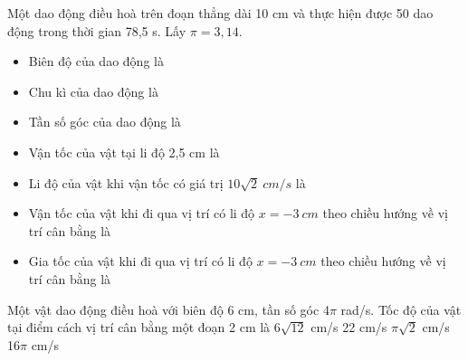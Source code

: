 \begin{vidu}
Một dao động điều hoà trên đoạn thẳng dài 10 cm và thực hiện được 50 dao động trong thời gian 78,5 s. Lấy $\pi=3,14$.
\begin{itemize}
\item [1.] Biên độ của dao động là\dotfill
\item [2.] Chu kì của dao động là\dotfill
\item [3.] Tần số góc của dao động là\dotfill
\item [4.] Vận tốc của vật tại li độ 2,5 cm là\dotfill
\item [5.] Li độ của vật khi vận tốc có giá trị $10\sqrt{2}\ cm/s$ là\dotfill
\item [6.] Vận tốc của vật khi đi qua vị trí có li độ $x=-3\ cm$ theo chiều hướng về vị trí cân bằng là\dotfill
\item [7.] Gia tốc của vật khi đi qua vị trí có li độ $x=-3\ cm$ theo chiều hướng về vị trí cân bằng là\dotfill
\end{itemize}
\end{vidu} %
\begin{vidu} %
Một vật dao động điều hoà với biên độ 6 cm, tần số góc 4$\pi$ rad/s. Tốc độ của vật tại điểm cách vị trí cân bằng một đoạn 2 cm là
\choice
{6$\sqrt{12}$ cm/s}
{22 cm/s}
{$\pi \sqrt{2}$ cm/s}
{16$\pi$ cm/s}
\end{vidu} %
